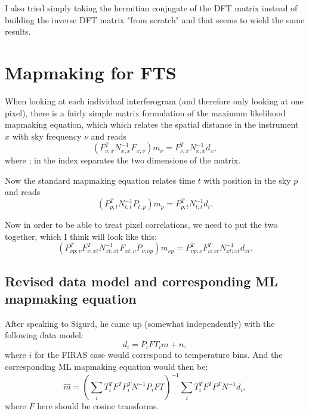 \documentclass{article}
\begin{document}
I also tried simply taking the hermitian conjugate of the DFT matrix instead of building the inverse DFT matrix "from scratch" and that seems to wield the same results.

\section{Mapmaking for FTS}

When looking at each individual interferogram (and therefore only looking at one pixel), there is a fairly simple matrix formulation of the maximum likelihood mapmaking equation, which which relates the spatial distance in the instrument $x$ with sky frequency $\nu$ and reads
\begin{equation}
	(F^T_{\nu; x} N^{-1}_{x;x} F_{x;\nu}) m_\nu = F^T_{\nu; x} N^{-1}_{x;x} d_x,
\end{equation}
where ; in the index separates the two dimensions of the matrix.

Now the standard mapmaking equation relates time $t$ with position in the sky $p$ and reads
\begin{equation}
	(P^T_{p;t} N^{-1}_{t;t} P_{t;p})m_p = P^T_{p;t} N^{-1}_{t;t}d_t.
\end{equation}

Now in order to be able to treat pixel correlations, we need to put the two together, which I think will look like this:
\begin{equation}
	(P^T_{\nu p;\nu}F^T_{\nu;xt} N^{-1}_{xt;xt} F_{xt;\nu}P_{\nu;\nu p})m_{\nu p} = P^T_{\nu p;\nu}F^T_{\nu;xt} N^{-1}_{xt;xt}d_{xt}.
\end{equation}

\subsection{Revised data model and corresponding ML mapmaking equation}

After speaking to Sigurd, he came up (somewhat independently) with the following data model:
\begin{equation}
	d_i = P_i F T_i m + n,
\end{equation}
where $i$ for the FIRAS case would correspond to temperature bins. And the corresponding ML mapmaking equation would then be:
\begin{equation}
	\hat m = \left(\sum_i T_i^T F^T P_i^T N^{-1} P_i F T \right)^{-1} \sum_i T_i^T F^T P^T N^{-1} d_i,
\end{equation}
where $F$ here should be cosine transforms.
\end{document}
